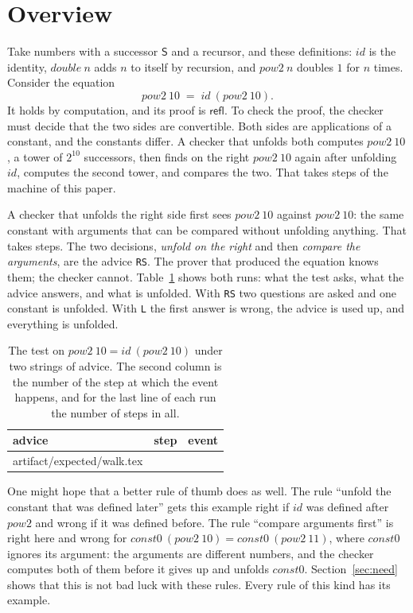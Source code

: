 \documentclass[acmsmall,nonacm,screen]{acmart}
\makeatletter
\newcommand{\kw}[1]{\mathsf{#1}}
\newcommand{\nm}[1]{\mathit{#1}}
\newcommand{\suc}{\kw{S}}
\newcommand{\refl}{\kw{refl}}
\newcommand{\adv}[1]{\textup{\texttt{#1}}}
\newcommand{\claim}[2]{#2}
\newcommand{\rows}[1]{\@@input artifact/expected/#1.tex }
\makeatother
\begin{document}
\section{Overview}
\label{sec:overview}

Take numbers with a successor $\suc$ and a recursor, and these definitions: $\nm{id}$ is the
identity, $\nm{double}\ n$ adds $n$ to itself by recursion, and $\nm{pow2}\ n$ doubles $1$
for $n$ times. Consider the equation
\[
  \nm{pow2}\ 10 \;=\; \nm{id}\ (\nm{pow2}\ 10) .
\]
It holds by computation, and its proof is $\refl$. To check the proof, the checker must
decide that the two sides are convertible. Both sides are applications of a constant, and
the constants differ. A checker that unfolds both computes $\nm{pow2}\ 10$, a tower of
$2^{10}$ successors, then finds on the right $\nm{pow2}\ 10$ again after unfolding
$\nm{id}$, computes the second tower, and compares the two.
\claim{overview}{That takes \exOverviewBlind{} steps of the machine of this paper.}

A checker that unfolds the right side first sees $\nm{pow2}\ 10$ against $\nm{pow2}\ 10$: the
same constant with arguments that can be compared without unfolding anything. \claim{advice-rs}{That
takes \exOverviewAdvised{} steps.} The two decisions, \emph{unfold on the right} and then
\emph{compare the arguments}, are the advice \adv{RS}. The prover that produced the equation
knows them; the checker cannot. \claim{walk}{Table~\ref{tab:walk} shows both runs: what the
test asks, what the advice answers, and what is unfolded.} With \adv{RS} two questions are
asked and one constant is unfolded. With \adv{L} the first answer is wrong, the advice is
used up, and everything is unfolded.

\begin{table}
\caption{The test on $\nm{pow2}\ 10 = \nm{id}\ (\nm{pow2}\ 10)$ under two strings of advice.
The second column is the number of the step at which the event happens, and for the last
line of each run the number of steps in all.}
\label{tab:walk}
\begin{tabular}{lrl}
\toprule
advice & step & event \\
\midrule
\rows{walk}
\bottomrule
\end{tabular}
\end{table}

One might hope that a better rule of thumb does as well. The rule ``unfold the constant that
was defined later'' gets this example right if $\nm{id}$ was defined after $\nm{pow2}$ and
wrong if it was defined before. The rule ``compare arguments first'' is right here and wrong
for $\nm{const0}\ (\nm{pow2}\ 10) = \nm{const0}\ (\nm{pow2}\ 11)$, where $\nm{const0}$ ignores
its argument: the arguments are different numbers, and the checker computes both of them
before it gives up and unfolds $\nm{const0}$. Section~\ref{sec:need} shows that this is not
bad luck with these rules. Every rule of this kind has its example.
\end{document}
